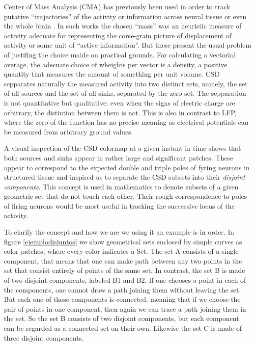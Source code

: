 \documentclass{article}
\begin{document}
Center of Mass Analysis (CMA) has previously been used in order to track putative  ``trajectories'' of the activity or information across neural tissue or even the whole brain \cite{Chao05, Manjarrez07}. In such works the chosen ``mass'' was an heuristic measure of activity adecuate for representing the corse-grain picture of displacement of activity or some unit of ``active information''. But these present the usual problem of justifing the choice maide on practical grounds. For calculating a vectorial average, the adecuate choice of wheights per vector is a density, a positive quantity that measures the amount of something per unit volume. CSD sepparates naturally the measured activity into two distinct sets, namely, the set of all sources and the set of all sinks, separated by the zero set. The sepparation is not quantitative but qualitative: even when the signs of electric charge are arbitrary, the distintion between them is not. 
This is also in contrast to LFP, where the zero of the function has no precise meaning as electrical potentials can be measured from arbitrary ground values.

A visual inspection of the CSD colormap at a given instant in time shows that both sources and sinks appear in rather large and significant patches. These appear to correspond to the expected double and triple poles of fyring neurons in structured tissue \cite{} and inspired us to separate the CSD subsets into their \emph{disjoint components}. This concept is used in mathematics to denote subsets of a given geometric set that do not touch each other. Their rough correspondence to poles of firing neurons would be most useful in tracking the successive locus of the activity.

To clarify the concept and how we are we using it an example is in order. In figure \ref{ejemplodisjuntos} we show geometrical sets enclosed by simple curves as color patches, where every color indicates a Set. The set A consists of a single component, that means that one can make  path between any two points in the set that consist entirely of points of the same set. In contrast, the set B is made of two disjoint components, labeled B1 and B2. If one chooses a point in each of the components, one cannot draw a path joining them without leaving the set. But each one of those components is connected, meaning that if we choose the pair of points in one component, then again we can trace a path joining them in the set. So the set B consists of two disjoint components, but each component can be regarded as a connected set on their own. Likewise the set C is made of three disjoint components. 
\end{document}
